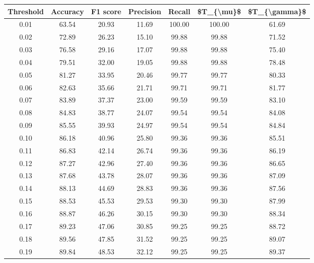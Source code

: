 \begin{tabular}{|c|c|c|c|c|c|c|}
\toprule
 Threshold &  Accuracy &  F1 score &  Precision &  Recall &  \$T\_\{\textbackslash mu\}\$ &  \$T\_\{\textbackslash gamma\}\$ \\
\hline
      0.01 &     63.54 &     20.93 &      11.69 &  100.00 &     100.00 &         61.69 \\
      0.02 &     72.89 &     26.23 &      15.10 &   99.88 &      99.88 &         71.52 \\
      0.03 &     76.58 &     29.16 &      17.07 &   99.88 &      99.88 &         75.40 \\
      0.04 &     79.51 &     32.00 &      19.05 &   99.88 &      99.88 &         78.48 \\
      0.05 &     81.27 &     33.95 &      20.46 &   99.77 &      99.77 &         80.33 \\
      0.06 &     82.63 &     35.66 &      21.71 &   99.71 &      99.71 &         81.77 \\
      0.07 &     83.89 &     37.37 &      23.00 &   99.59 &      99.59 &         83.10 \\
      0.08 &     84.83 &     38.77 &      24.07 &   99.54 &      99.54 &         84.08 \\
      0.09 &     85.55 &     39.93 &      24.97 &   99.54 &      99.54 &         84.84 \\
      0.10 &     86.18 &     40.96 &      25.80 &   99.36 &      99.36 &         85.51 \\
      0.11 &     86.83 &     42.14 &      26.74 &   99.36 &      99.36 &         86.19 \\
      0.12 &     87.27 &     42.96 &      27.40 &   99.36 &      99.36 &         86.65 \\
      0.13 &     87.68 &     43.78 &      28.07 &   99.36 &      99.36 &         87.09 \\
      0.14 &     88.13 &     44.69 &      28.83 &   99.36 &      99.36 &         87.56 \\
      0.15 &     88.53 &     45.53 &      29.53 &   99.30 &      99.30 &         87.99 \\
      0.16 &     88.87 &     46.26 &      30.15 &   99.30 &      99.30 &         88.34 \\
      0.17 &     89.23 &     47.06 &      30.85 &   99.25 &      99.25 &         88.72 \\
      0.18 &     89.56 &     47.85 &      31.52 &   99.25 &      99.25 &         89.07 \\
      0.19 &     89.84 &     48.53 &      32.12 &   99.25 &      99.25 &         89.37 \\

\end{tabular}
